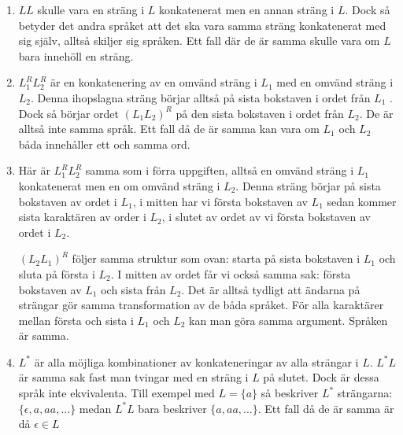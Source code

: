 \documentclass{article}
\begin{document}
\begin{enumerate}[label=(\alph*)]
    \item 
    $LL$ skulle vara en sträng i $L$ konkatenerat men en annan sträng i $L$. Dock så betyder det andra språket att det ska vara samma sträng konkatenerat med sig själv, alltså skiljer sig språken. Ett fall där de är samma skulle vara om $L$ bara innehöll en sträng.
    
    \item
    $L_1^R L_2^R$ är en konkatenering av en omvänd sträng i $L_1$  med en omvänd sträng i $L_2$. Denna ihopslagna sträng börjar alltså på sista bokstaven i ordet från $L_1$ . Dock så börjar ordet $(L_1 L_2)^R$ på den sista bokstaven i ordet från $L_2$. De är alltså inte samma språk. Ett fall då de är samma kan vara om $L_1$ och $L_2$ båda innehåller ett och samma ord.
    
    \item
    Här är $L_1^R L_2^R$ samma som i förra uppgiften, alltså en omvänd sträng i $L_1$ konkatenerat men en om omvänd sträng i $L_2$. Denna sträng börjar på sista bokstaven av ordet i $L_1$, i mitten har vi första bokstaven av $L_1$ sedan kommer sista karaktären av order i $L_2$, i slutet av ordet av vi första bokstaven av ordet i $L_2$.
    
    $(L_2 L_1)^R$ följer samma struktur som ovan: starta på sista bokstaven i $L_1$ och sluta på första i $L_2$. I mitten av ordet får vi också samma sak: första bokstaven av $L_1$ och sista från $L_2$. Det är alltså tydligt att ändarna på strängar gör samma transformation av de båda språket. För alla karaktärer mellan första och sista i $L_1$ och $L_2$ kan man göra samma argument. Språken är samma.
    
    \item
    $L^*$ är alla möjliga kombinationer av konkateneringar av alla strängar i $L$. $L^*L$ är samma sak fast man tvingar med en sträng i $L$ på slutet. Dock är dessa språk inte ekvivalenta. Till exempel med $L=\{a\}$ så beskriver $L^*$ strängarna: $\{\epsilon, a, aa, ...\}$ medan $L^*L$ bara beskriver $\{a, aa, ...\}$. Ett fall då de är samma är då $\epsilon \in L$
    
\end{enumerate}

\section{}
\end{document}
